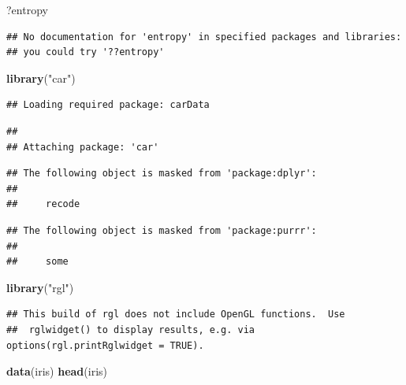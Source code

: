 \documentclass[
]{article}
\newenvironment{Shaded}{\begin{snugshade}}{\end{snugshade}}
\newcommand{\FunctionTok}[1]{\textcolor[rgb]{0.13,0.29,0.53}{\textbf{#1}}}
\newcommand{\NormalTok}[1]{#1}
\newcommand{\StringTok}[1]{\textcolor[rgb]{0.31,0.60,0.02}{#1}}
\begin{document}
\begin{Shaded}
\begin{Highlighting}[]
\NormalTok{?entropy}
\end{Highlighting}
\end{Shaded}

\begin{verbatim}
## No documentation for 'entropy' in specified packages and libraries:
## you could try '??entropy'
\end{verbatim}

\begin{Shaded}
\begin{Highlighting}[]
\FunctionTok{library}\NormalTok{(}\StringTok{"car"}\NormalTok{)}
\end{Highlighting}
\end{Shaded}

\begin{verbatim}
## Loading required package: carData
\end{verbatim}

\begin{verbatim}
## 
## Attaching package: 'car'
\end{verbatim}

\begin{verbatim}
## The following object is masked from 'package:dplyr':
## 
##     recode
\end{verbatim}

\begin{verbatim}
## The following object is masked from 'package:purrr':
## 
##     some
\end{verbatim}

\begin{Shaded}
\begin{Highlighting}[]
\FunctionTok{library}\NormalTok{(}\StringTok{"rgl"}\NormalTok{)}
\end{Highlighting}
\end{Shaded}

\begin{verbatim}
## This build of rgl does not include OpenGL functions.  Use
##  rglwidget() to display results, e.g. via options(rgl.printRglwidget = TRUE).
\end{verbatim}

\begin{Shaded}
\begin{Highlighting}[]
\FunctionTok{data}\NormalTok{(iris)}
\FunctionTok{head}\NormalTok{(iris)}
\end{Highlighting}
\end{Shaded}
\end{document}
